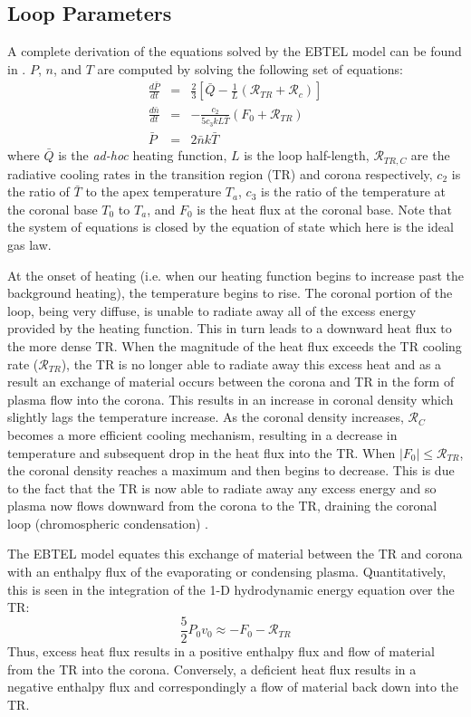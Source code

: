 \documentclass[preprint,10pt]{aastex}
\begin{document}
\subsection{Loop Parameters}
A complete derivation of the equations solved by the EBTEL model can be found in \citet{klimchuk_highly_2008,cargill_enthalpy-based_2012}. $P$, $n$, and $T$ are computed by solving the following set of equations:
\begin{eqnarray}
\frac{d\bar{P}}{dt}&=&\frac{2}{3}\left[\bar{Q}-\frac{1}{L}(\mathcal{R}_{TR}+\mathcal{R}_c)\right] \\ 
\frac{d\bar{n}}{dt}&=&-\frac{c_2}{5c_3kL\bar{T}}(F_0+\mathcal{R}_{TR}) \\
\bar{P}&=&2\bar{n}k\bar{T}
\label{eq:pnteqns}
\end{eqnarray}
%
where $\bar{Q}$ is the \textit{ad-hoc} heating function, $L$ is the loop half-length, $\mathcal{R}_{TR,C}$ are the radiative cooling rates in the transition region (TR) and corona respectively, $c_2$ is the ratio of $\bar{T}$ to the apex temperature $T_a$, $c_3$ is the ratio of the temperature at the coronal base $T_0$ to $T_a$, and $F_0$ is the heat flux at the coronal base. Note that the system of equations is closed by the equation of state which here is the ideal gas law.
\par At the onset of heating (i.e. when our heating function begins to increase past the background heating), the temperature begins to rise. The coronal portion of the loop, being very diffuse, is unable to radiate away all of the excess energy provided by the heating function. This in turn leads to a downward heat flux to the more dense TR. When the magnitude of the heat flux exceeds the TR cooling rate ($\mathcal{R}_{TR}$), the TR is no longer able to radiate away this excess heat and as a result an exchange of material occurs between the corona and TR in the form of plasma flow into the corona. This results in an increase in coronal density which slightly lags the temperature increase. As the coronal density increases, $\mathcal{R}_C$ becomes a more efficient cooling mechanism, resulting in a decrease in temperature  and subsequent drop in the heat flux into the TR. When $|F_0| \le \mathcal{R}_{TR}$, the coronal density reaches a maximum and then begins to decrease. This is due to the fact that the TR is now able to radiate away any excess energy and so plasma now flows downward from the corona to the TR, draining the coronal loop (chromospheric condensation) \citep{klimchuk_highly_2008}.
\par The EBTEL model equates this exchange of material between the TR and corona with an enthalpy flux of the evaporating or condensing plasma. Quantitatively, this is seen in the integration of the 1-D hydrodynamic energy equation over the TR:
\begin{equation}
\frac{5}{2}P_0v_0\approx-F_0-\mathcal{R}_{TR}
\label{eq:enthalpy}
\end{equation}
Thus, excess heat flux results in a positive enthalpy flux and flow of material from the TR into the corona. Conversely, a deficient heat flux results in a negative enthalpy flux and correspondingly a flow of material back down into the TR.
\end{document}
